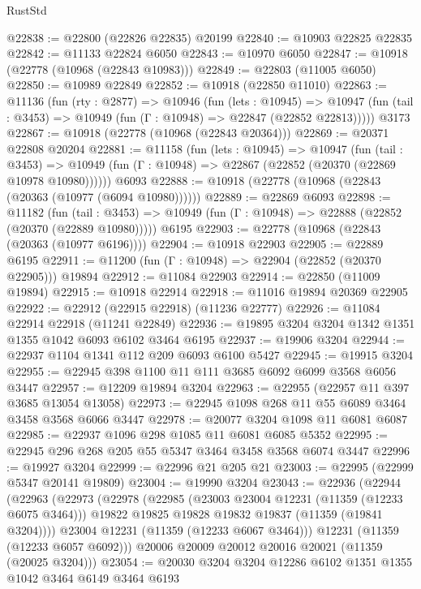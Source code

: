 \begin{lexlean}{RustStd}
\begin{coremodule}
{{{{{{{{{{{{{{{{{{{@22838 := @22800 (@22826 @22835) @20199
@22840 := @10903 @22825 @22835
@22842 := @11133 @22824 @6050
@22843 := @10970 @6050
@22847 := @10918 (@22778 (@10968 (@22843 @10983)))
@22849 := @22803 (@11005 @6050)
@22850 := @10989 @22849
@22852 := @10918 (@22850 @11010)
@22863 := @11136
    (fun (rty : @2877) =>
    @10946
      (fun (lets : @10945) =>
      @10947 (fun (tail : @3453) => @10949 (fun (Γ : @10948) => @22847 (@22852 @22813)))))
    @3173
@22867 := @10918 (@22778 (@10968 (@22843 @20364)))
@22869 := @20371 @22808 @20204
@22881 := @11158
    (fun (lets : @10945) =>
    @10947
      (fun (tail : @3453) =>
      @10949 (fun (Γ : @10948) => @22867 (@22852 (@20370 (@22869 @10978 @10980))))))
    @6093
@22888 := @10918 (@22778 (@10968 (@22843 (@20363 (@10977 (@6094 @10980))))))
@22889 := @22869 @6093
@22898 := @11182
    (fun (tail : @3453) => @10949 (fun (Γ : @10948) => @22888 (@22852 (@20370 (@22889 @10980)))))
    @6195
@22903 := @22778 (@10968 (@22843 (@20363 (@10977 @6196))))
@22904 := @10918 @22903
@22905 := @22889 @6195
@22911 := @11200 (fun (Γ : @10948) => @22904 (@22852 (@20370 @22905))) @19894
@22912 := @11084 @22903
@22914 := @22850 (@11009 @19894)
@22915 := @10918 @22914
@22918 := @11016 @19894 @20369 @22905
@22922 := @22912 (@22915 @22918) (@11236 @22777)
@22926 := @11084 @22914 @22918 (@11241 @22849)
@22936 := @19895 @3204 @3204 @1342 @1351 @1355 @1042 @6093 @6102 @3464 @6195
@22937 := @19906 @3204
@22944 := @22937 @1104 @1341 @112 @209 @6093 @6100 @5427
@22945 := @19915 @3204
@22955 := @22945 @398 @1100 @11 @111 @3685 @6092 @6099 @3568 @6056 @3447
@22957 := @12209 @19894 @3204
@22963 := @22955 (@22957 @11 @397 @3685 @13054 @13058)
@22973 := @22945 @1098 @268 @11 @55 @6089 @3464 @3458 @3568 @6066 @3447
@22978 := @20077 @3204 @1098 @11 @6081 @6087
@22985 := @22937 @1096 @298 @1085 @11 @6081 @6085 @5352
@22995 := @22945 @296 @268 @205 @55 @5347 @3464 @3458 @3568 @6074 @3447
@22996 := @19927 @3204
@22999 := @22996 @21 @205 @21
@23003 := @22995 (@22999 @5347 @20141 @19809)
@23004 := @19990 @3204
@23043 := @22936
    (@22944
      (@22963
        (@22973
          (@22978
            (@22985
              (@23003 @23004 @12231 (@11359 (@12233 @6075 @3464)))
              @19822
              @19825
              @19828
              @19832
              @19837
              (@11359 (@19841 @3204))))
          @23004
          @12231
          (@11359 (@12233 @6067 @3464)))
        @12231
        (@11359 (@12233 @6057 @6092)))
      @20006
      @20009
      @20012
      @20016
      @20021
      (@11359 (@20025 @3204)))
@23054 := @20030 @3204 @3204 @12286 @6102 @1351 @1355 @1042 @3464 @6149 @3464 @6193
}}}}}}}}}}}}}}}}}}}
\end{coremodule}
\end{lexlean}
